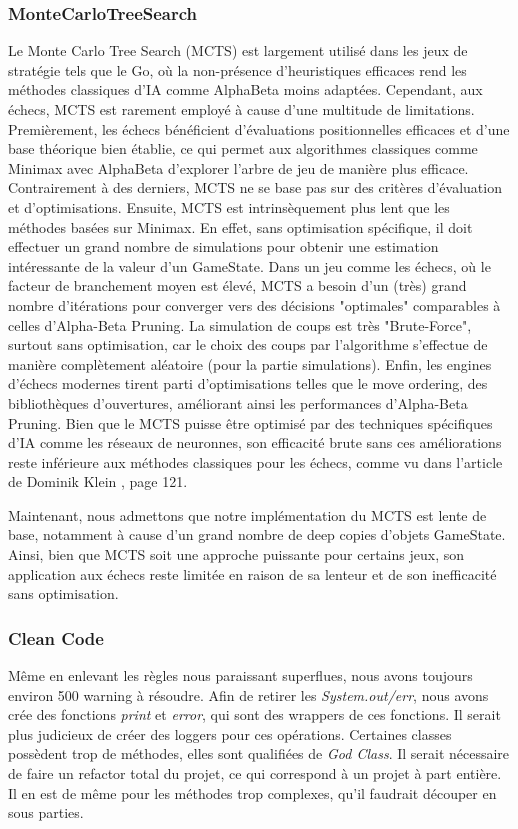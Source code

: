 \documentclass{article}
\begin{document}
\subsubsection{MonteCarloTreeSearch}
Le Monte Carlo Tree Search (MCTS) est largement utilisé dans les jeux de stratégie tels que le Go, où la non-présence d'heuristiques efficaces rend les méthodes classiques d'IA comme
AlphaBeta moins adaptées. Cependant, aux échecs, MCTS est rarement employé à cause d'une multitude de limitations.
Premièrement, les échecs bénéficient d'évaluations positionnelles efficaces et d'une base théorique bien établie, ce qui permet aux algorithmes classiques 
comme Minimax avec AlphaBeta d'explorer l'arbre de jeu de manière plus efficace. Contrairement à des derniers, MCTS ne se base pas sur des critères 
d'évaluation et d'optimisations. Ensuite, MCTS est intrinsèquement plus lent que les méthodes basées sur Minimax. En effet, sans optimisation spécifique, 
il doit effectuer un grand nombre de simulations pour obtenir une estimation intéressante de la valeur d'un GameState. Dans un jeu comme les échecs, où le 
facteur de branchement moyen est élevé, MCTS a besoin d'un (très) grand nombre d'itérations pour converger vers des décisions "optimales" comparables à 
celles d'Alpha-Beta Pruning. La simulation de coups est très "Brute-Force", surtout sans optimisation, car le choix des coups par l'algorithme s'effectue 
de manière complètement aléatoire (pour la partie simulations).
Enfin, les engines d'échecs modernes tirent parti d'optimisations telles que le move ordering, des bibliothèques d'ouvertures, améliorant ainsi les 
performances d'Alpha-Beta Pruning. Bien que le MCTS puisse être optimisé par des techniques spécifiques d'IA comme les réseaux de neuronnes, son 
efficacité brute sans ces améliorations reste inférieure aux méthodes classiques pour les échecs, comme vu dans l'article de Dominik Klein \cite{NNChess}, 
page 121. 

Maintenant, nous admettons que notre implémentation du MCTS est
lente de base, notamment à cause d'un grand nombre de deep copies d'objets GameState.
Ainsi, bien que MCTS soit une approche puissante pour certains jeux, son application aux échecs reste limitée en raison de sa lenteur et de son inefficacité 
sans optimisation.

\subsubsection{Clean Code}
Même en enlevant les règles nous paraissant superflues, nous avons toujours environ 500 warning à résoudre.
Afin de retirer les \textit{System.out/err}, nous avons crée des fonctions \textit{print} et \textit{error}, qui sont des wrappers de ces fonctions. Il serait plus judicieux de créer
des loggers pour ces opérations.
Certaines classes possèdent trop de méthodes, elles sont qualifiées de \textit{God Class}. Il serait nécessaire de faire un refactor total du projet, ce qui correspond à un projet à part entière.
Il en est de même pour les méthodes trop complexes, qu'il faudrait découper en sous parties.
\end{document}
